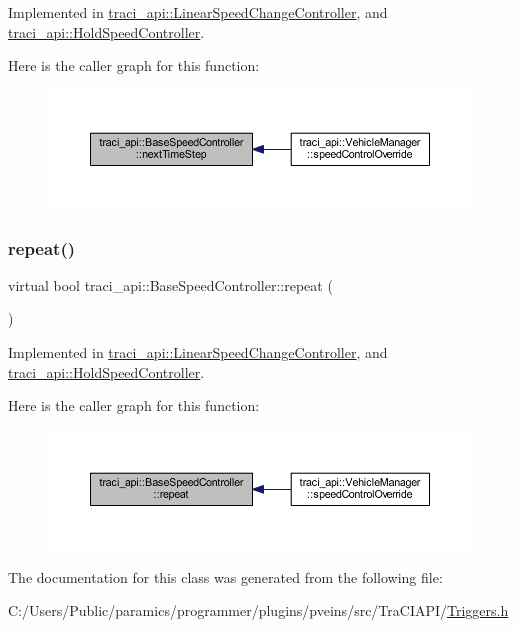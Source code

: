Implemented in \hyperlink{classtraci__api_1_1_linear_speed_change_controller_a31e52d6f77c96a88dda160226335bacd}{traci\+\_\+api\+::\+Linear\+Speed\+Change\+Controller}, and \hyperlink{classtraci__api_1_1_hold_speed_controller_a61476bf22b8252d2a0badd2214b7357a}{traci\+\_\+api\+::\+Hold\+Speed\+Controller}.

Here is the caller graph for this function\+:
\nopagebreak
\begin{figure}[H]
\begin{center}
\leavevmode
\includegraphics[width=350pt]{classtraci__api_1_1_base_speed_controller_ab9658ce36f91de8a34bb710b3241c210_icgraph}
\end{center}
\end{figure}
\mbox{\label{classtraci__api_1_1_base_speed_controller_a2d4b22945d4cb27f5fe24b05700021b6}} 
\subsubsection{\texorpdfstring{repeat()}{repeat()}}
{\footnotesize\ttfamily virtual bool traci\+\_\+api\+::\+Base\+Speed\+Controller\+::repeat (\begin{DoxyParamCaption}{ }\end{DoxyParamCaption})\hspace{0.3cm}{\ttfamily [pure virtual]}}



Implemented in \hyperlink{classtraci__api_1_1_linear_speed_change_controller_aaa5f31ea0c57db838a5786509fc03446}{traci\+\_\+api\+::\+Linear\+Speed\+Change\+Controller}, and \hyperlink{classtraci__api_1_1_hold_speed_controller_acf2f2b8595dd8a135b13be736ee29d63}{traci\+\_\+api\+::\+Hold\+Speed\+Controller}.

Here is the caller graph for this function\+:
\nopagebreak
\begin{figure}[H]
\begin{center}
\leavevmode
\includegraphics[width=350pt]{classtraci__api_1_1_base_speed_controller_a2d4b22945d4cb27f5fe24b05700021b6_icgraph}
\end{center}
\end{figure}


The documentation for this class was generated from the following file\+:\begin{DoxyCompactItemize}
\item 
C\+:/\+Users/\+Public/paramics/programmer/plugins/pveins/src/\+Tra\+C\+I\+A\+P\+I/\hyperlink{_triggers_8h}{Triggers.\+h}\end{DoxyCompactItemize}
